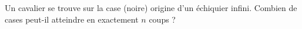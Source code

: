 Un cavalier se trouve sur la case (noire) origine d'un échiquier infini. Combien de cases peut-il atteindre en exactement $n$ coups ?
